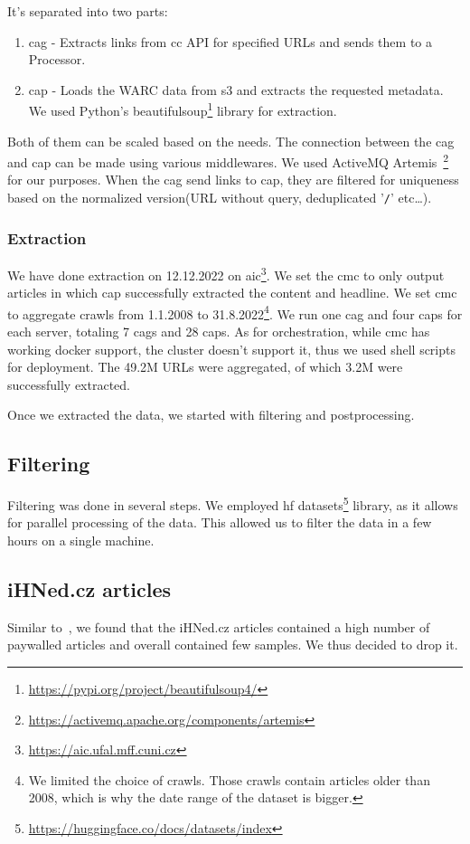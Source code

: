 It's separated into two parts:
\begin{enumerate}
    \item \ac{cag} -
          Extracts links from \ac{cc} API for specified URLs and sends them to a Processor.
    \item \ac{cap} -
          Loads the WARC data from \ac{s3} and extracts the requested metadata.
          We used Python's beautifulsoup\footnote{\url{https://pypi.org/project/beautifulsoup4/}} library for extraction.
\end{enumerate}
Both of them can be scaled based on the needs.
The connection between the \ac{cag} and \ac{cap} can be made using various middlewares.
We used ActiveMQ Artemis~\footnote{\url{https://activemq.apache.org/components/artemis}} for our purposes.
When the \ac{cag} send links to \ac{cap},
they are filtered for uniqueness based on the normalized version(URL without query, deduplicated '\verb|/|' etc\dots).
\subsubsection{Extraction}
We have done extraction on 12.12.2022 on \ac{aic}\footnote{\url{https://aic.ufal.mff.cuni.cz}}.
We set the \ac{cmc} to only output articles in which \ac{cap} successfully
extracted the content and headline.
We set \ac{cmc} to aggregate crawls from 1.1.2008 to 31.8.2022\footnote{
    We limited the choice of crawls. Those crawls contain articles older than 2008,
    which is why the date range of the dataset is bigger.}.
We run one \ac{cag} and four \acp{cap} for each server,
totaling 7 \acp{cag} and 28 \acp{cap}.
As for orchestration, while \ac{cmc} has working docker support,
the cluster doesn't support it, thus we used shell scripts for deployment.
The 49.2M URLs were aggregated, of which 3.2M were successfully extracted.

Once we extracted the data, we started with filtering and postprocessing.
\subsection{Filtering}

Filtering was done in several steps. We employed \ac{hf} datasets\footnote{\url{https://huggingface.co/docs/datasets/index}}
library, as it allows for parallel processing of the data.
This allowed us to filter the data in a few hours on a single machine.


\subsection{iHNed.cz articles}
Similar to~\textcite{strakaSumeCzechLargeCzech2018a}, we found that the iHNed.cz articles contained
a high number of paywalled articles and overall contained few samples.
We thus decided to drop it.

